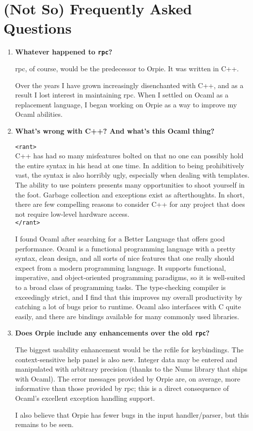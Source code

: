 \documentclass[11pt,notitlepage]{article}
\begin{document}
\section{(Not So) Frequently Asked Questions}
\begin{enumerate}
   \item {\bf Whatever happened to {\tt rpc}?}

      rpc, of course, would be the predecessor to Orpie.  It was written
      in C++.

      Over the years I have grown increasingly disenchanted with C++, and
      as a result I lost interest in maintaining rpc.  When I settled on Ocaml
      as a replacement language, I began working on Orpie as a way to improve
      my Ocaml abilities.

   \item {\bf What's wrong with C++?  And what's this Ocaml thing?}

      {\tt <rant>} \\
      C++ has had so many misfeatures bolted on that no one can possibly hold
      the entire syntax in his head at one time.  In addition to being
      prohibitively vast, the syntax is also horribly ugly,
      especially when dealing with templates.  The ability to use pointers
      presents many opportunities to shoot yourself in the foot.
      Garbage collection and exceptions exist as afterthoughts.  In short, there
      are few compelling reasons to consider C++ for any project that does not require
      low-level hardware access. \\
      {\tt </rant>} 
     
      I found Ocaml after searching for a Better Language that offers good
      performance.  Ocaml is a functional programming language with a pretty
      syntax, clean design, and all sorts of nice features that one really
      should expect from a modern programming language.  It supports
      functional, imperative, and object-oriented programming paradigms,
      so it is well-suited to a broad class of programming tasks.
      The type-checking compiler is exceedingly strict, and I find that this
      improves my overall productivity by catching a lot of bugs prior to
      runtime.  Ocaml also interfaces with C quite easily, and there are
      bindings available for many commonly used libraries.

   \item {\bf Does Orpie include any enhancements over the old {\tt rpc}?}

      The biggest usability enhancement would be the rcfile for keybindings.
      The context-sensitive help panel is also new.  Integer data may be
      entered and manipulated with arbitrary precision (thanks to the Nums 
      library that ships with Ocaml).  The error messages provided by
      Orpie are, on average, more informative than those provided by rpc;
      this is a direct consequence of Ocaml's excellent exception handling
      support.

      I also believe that Orpie has fewer bugs in the input handler/parser,
      but this remains to be seen.
\end{enumerate}
\end{document}

